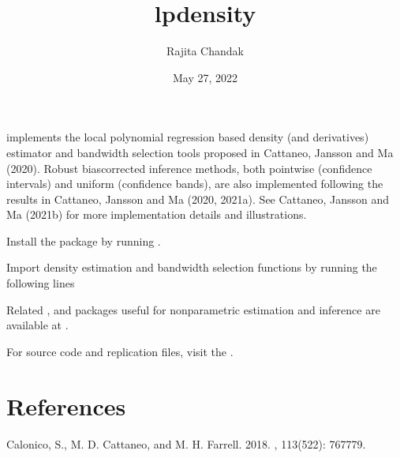 \documentclass[letterpaper,10pt,english]{sphinxmanual}
\title{lpdensity}
\date{May 27, 2022}
\author{Rajita Chandak}
\begin{document}
\pagestyle{empty}
\sphinxmaketitle
\pagestyle{plain}
\sphinxtableofcontents
\pagestyle{normal}
\label{\detokenize{index::doc}}


\sphinxAtStartPar
{} implements the local polynomial regression based density (and derivatives) estimator and bandwidth selection tools proposed in Cattaneo, Jansson and Ma (2020).  Robust bias\sphinxhyphen{}corrected inference methods,
both pointwise (confidence intervals) and uniform (confidence bands), are also implemented
following the results in Cattaneo, Jansson and Ma (2020, 2021a).
See Cattaneo, Jansson and Ma (2021b) for more implementation details and illustrations.

\sphinxAtStartPar
Install the  package by running
.

\sphinxAtStartPar
Import density estimation and bandwidth selection functions by running the following lines

\begin{sphinxVerbatim}[commandchars=\\\{\}]
   
\end{sphinxVerbatim}

\begin{sphinxVerbatim}[commandchars=\\\{\}]
   
\end{sphinxVerbatim}

\sphinxAtStartPar
Related ,  and  packages useful for nonparametric estimation and inference are
available at .

\sphinxAtStartPar
For source code and replication files, visit the .


\chapter{References}
\label{\detokenize{index:references}}
\sphinxAtStartPar
Calonico, S., M. D. Cattaneo, and M. H. Farrell. 2018.
, 113(522): 767\sphinxhyphen{}779.
\end{document}
